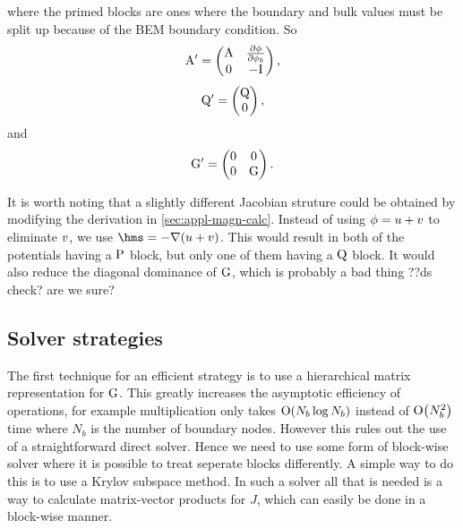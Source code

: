 where the primed blocks are ones where the boundary and bulk values must be split up because of the BEM boundary condition.
So
\begin{equation}
  \mathrm{A}' =
  \begin{pmatrix}
    \mathrm{A}     & \frac{\partial \phi}{\partial \phi_b} \\
    0      & -\mathrm{I}  
  \end{pmatrix},
\end{equation}
\begin{equation}
  \mathrm{Q}' =
  \begin{pmatrix}
    \mathrm{Q} \\
    0    
  \end{pmatrix},
\end{equation}
and
\begin{equation}
  {\mathbf{\mathrm{G}}}' =
  \begin{pmatrix}
    0  & 0 \\
    0  & {\mathbf{\mathrm{G}}} 
  \end{pmatrix}.
\end{equation}


It is worth noting that a slightly different Jacobian struture could be obtained by modifying the derivation in \cref{sec:appl-magn-calc}.
Instead of using $\phi = u + v$ to eliminate $v$, we use $\hms = - \grad ( \phione + \phitwo)$.
This would result in both of the potentials having a $\mathrm{P}$ block, but only one of them having a $\mathrm{Q}$ block.
It would also reduce the diagonal dominance of ${\mathbf{\mathrm{G}}}$, which is probably a bad thing ??ds check? are we sure?


\subsection{Solver strategies}
\label{sec:bem-solver-strategies}

The first technique for an efficient strategy is to use a hierarchical matrix representation for ${\mathbf{\mathrm{G}}}$.
This greatly increases the asymptotic efficiency of operations, for example multiplication only takes $\mathrm{O}{\left( N_b \log N_b \right)}$ instead of $\mathrm{O}{\left( N_b^2 \right)}$ time where $N_b$ is the number of boundary nodes.
However this rules out the use of a straightforward direct solver.
Hence we need to use some form of block-wise solver where it is possible to treat seperate blocks differently.
A simple way to do this is to use a Krylov subspace method.
In such a solver all that is needed is a way to calculate matrix-vector products for $J$, which can easily be done in a block-wise manner.

